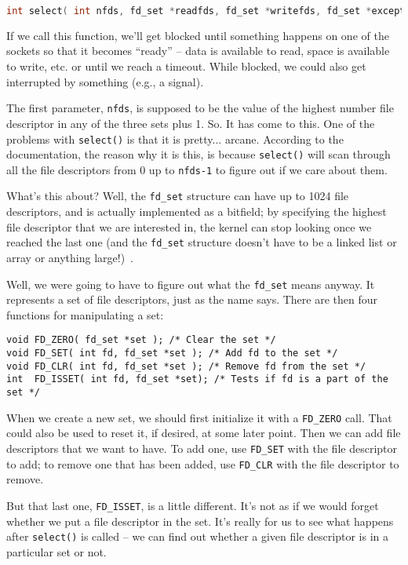 \begin{lstlisting}[language=C]
 int select( int nfds, fd_set *readfds, fd_set *writefds, fd_set *exceptfds, struct timeval *timeout );
\end{lstlisting}

If we call this function, we'll get blocked until something happens on one of the sockets so that it becomes ``ready'' -- data is available to read, space is available to write, etc. or until we reach a timeout. While blocked, we could also get interrupted by something (e.g., a signal).

The first parameter, \texttt{nfds}, is supposed to be the value of the highest number file descriptor in any of the three sets plus 1. So. It has come to this. One of the problems with \texttt{select()} is that it is pretty... arcane. According to the documentation, the reason why it is this, is because \texttt{select()} will scan through all the file descriptors from 0 up to \texttt{nfds-1} to figure out if we care about them. 

What's this about? Well, the \texttt{fd\_set} structure can have up to 1024 file descriptors, and is actually implemented as a bitfield; by specifying the highest file descriptor that we are interested in, the kernel can stop looking once we reached the last one (and the \texttt{fd\_set} structure doesn't have to be a linked list or array or anything large!)~\cite{apunix}.

Well, we were going to have to figure out what the \texttt{fd\_set} means anyway. It represents a set of file descriptors, just as the name says.  There are then four functions for manipulating a set:

\begin{lstlisting}
void FD_ZERO( fd_set *set ); /* Clear the set */
void FD_SET( int fd, fd_set *set ); /* Add fd to the set */
void FD_CLR( int fd, fd_set *set ); /* Remove fd from the set */
int  FD_ISSET( int fd, fd_set *set); /* Tests if fd is a part of the set */ 
\end{lstlisting}

When we create a new set, we should first initialize it with a \texttt{FD\_ZERO} call. That could also be used to reset it, if desired, at some later point. Then we can add file descriptors that we want to have. To add one, use \texttt{FD\_SET} with the file descriptor to add; to remove one that has been added, use \texttt{FD\_CLR} with the file descriptor to remove. 

But that last one, \texttt{FD\_ISSET}, is a little different. It's not as if we would forget whether we put a file descriptor in the set. It's really for us to see what happens after \texttt{select()} is called -- we can find out whether a given file descriptor is in a particular set or not.

